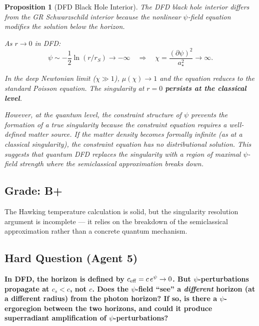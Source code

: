 \documentclass[11pt,a4paper]{article}
\newtheorem{proposition}{Proposition}
\begin{document}
\begin{proposition}[DFD Black Hole Interior]
The DFD black hole interior differs from the GR Schwarzschild interior because the nonlinear $\psi$-field equation modifies the solution below the horizon.

As $r \to 0$ in DFD:
\begin{equation}
\psi \sim -\frac{1}{2}\ln(r/r_S) \to -\infty \quad\Rightarrow\quad \chi = \frac{(\partial\psi)^2}{a_\star^2} \to \infty.
\end{equation}

In the deep Newtonian limit ($\chi \gg 1$), $\mu(\chi) \to 1$ and the equation reduces to the standard Poisson equation. The singularity at $r = 0$ \textbf{persists at the classical level}.

However, at the quantum level, the constraint structure of $\psi$ prevents the formation of a true singularity because the constraint equation requires a well-defined matter source. If the matter density becomes formally infinite (as at a classical singularity), the constraint equation has no distributional solution. This suggests that quantum DFD replaces the singularity with a region of maximal $\psi$-field strength where the semiclassical approximation breaks down.
\end{proposition}

\subsection{Grade: B+}

The Hawking temperature calculation is solid, but the singularity resolution argument is incomplete --- it relies on the breakdown of the semiclassical approximation rather than a concrete quantum mechanism.

\subsection{Hard Question (Agent 5)}

\textbf{In DFD, the horizon is defined by $c_{\rm eff} = c\,e^\psi \to 0$. But $\psi$-perturbations propagate at $c_s < c$, not $c$. Does the $\psi$-field ``see'' a \emph{different} horizon (at a different radius) from the photon horizon? If so, is there a $\psi$-ergoregion between the two horizons, and could it produce superradiant amplification of $\psi$-perturbations?}

\newpage

\end{document}
